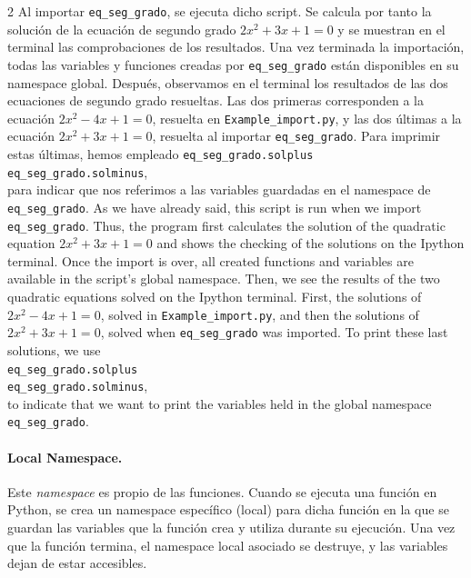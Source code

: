 \begin{paracol}{2}
Al importar \texttt{eq_seg_grado}, se ejecuta dicho script. Se calcula por tanto la solución de la ecuación de segundo grado $2x^2+3x+1=0$ y se muestran en el terminal las comprobaciones de los resultados. Una vez terminada la importación, todas las variables y funciones creadas por \texttt{eq_seg_grado} están disponibles en su namespace global. Después, observamos en el terminal los resultados de las dos ecuaciones de segundo grado resueltas. Las dos primeras corresponden a la ecuación $2x^2-4x+1=0$, resuelta en \texttt{Example_import.py}, y las dos últimas a la ecuación $2x^2+3x+1=0$, resuelta al importar \texttt{eq_seg_grado}. Para imprimir estas últimas, hemos empleado \texttt{eq_seg_grado.solplus}\\
\texttt{eq_seg_grado.solminus},\\ 
para indicar que nos referimos a las variables guardadas en el namespace de \texttt{eq_seg_grado}.
\switchcolumn
As we have already said, this script is run when we import \texttt{eq_seg_grado}. Thus, the program first calculates the solution of the quadratic equation $2x^2+3x+1=0$ and shows the checking of the solutions on the Ipython terminal. Once the import is over, all created functions and variables are available in the script's global namespace. Then, we see the results of the two quadratic equations solved on the Ipython terminal. First, the solutions of $2x^2-4x+1=0$, solved in \texttt{Example_import.py}, and then the solutions of $2x^2+3x+1=0$, solved when \texttt{eq_seg_grado} was imported. To print these last solutions, we use\\
\texttt{eq_seg_grado.solplus}\\ 
\texttt{eq_seg_grado.solminus},\\
to indicate that we want to print the variables held in the global namespace \texttt{eq_seg_grado}.  

\switchcolumn
\paragraph{Local Namespace.} Este \emph{namespace} es propio de las funciones. Cuando se ejecuta una función en Python, se crea un  namespace específico (local)  para dicha función en la que se guardan las variables que la función crea y utiliza durante su ejecución. Una vez que la función termina, el namespace local asociado se destruye, y las variables dejan de estar accesibles.


\end{paracol}
